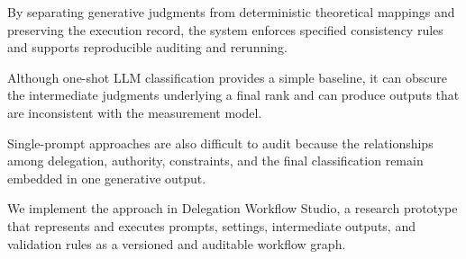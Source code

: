 By separating generative judgments from deterministic theoretical
mappings and preserving the execution record, the system enforces
specified consistency rules and supports reproducible auditing and
rerunning.

%


%

Although one-shot LLM classification provides a simple baseline, it
can obscure the intermediate judgments underlying a final rank and can
produce outputs that are inconsistent with the measurement model.


Single-prompt approaches are also difficult to audit because the
relationships among delegation, authority, constraints, and the final
classification remain embedded in one generative output.

%

We implement the approach in Delegation Workflow Studio, a research
prototype that represents and executes prompts, settings, intermediate
outputs, and validation rules as a versioned and auditable workflow
graph.

%


%
%

